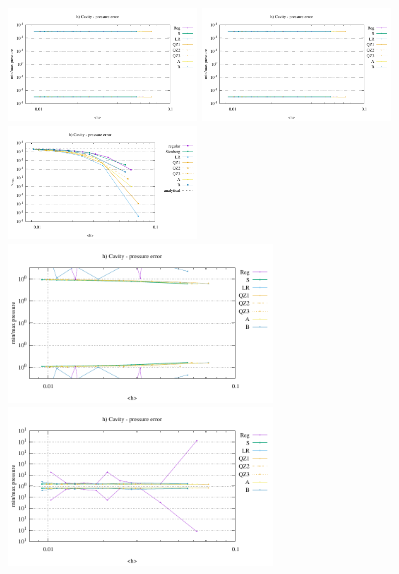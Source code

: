 \begin{center}
\includegraphics[width=5cm]{python_codes/fieldstone_78/results/mms_cavity/ustats}
\includegraphics[width=5cm]{python_codes/fieldstone_78/results/mms_cavity/vstats}
\includegraphics[width=5cm]{python_codes/fieldstone_78/results/mms_cavity/vrms.pdf}\\
\includegraphics[width=7cm]{python_codes/fieldstone_78/results/mms_cavity/pstats.pdf}
\includegraphics[width=7cm]{python_codes/fieldstone_78/results/mms_cavity/qstats}
\end{center}

